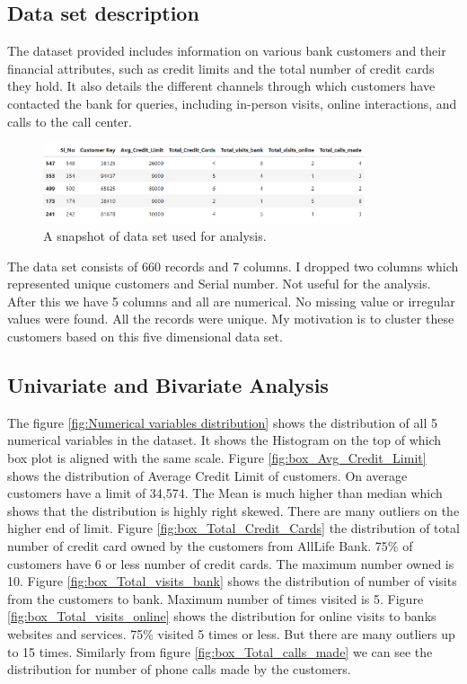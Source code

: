 \documentclass[10pt,a4paper]{style}
\begin{document}
	\subsection{Data set description}
		The dataset provided includes information on various bank customers and their financial attributes, such as credit limits and the total number of credit cards they hold. It also details the different channels through which customers have contacted the bank for queries, including in-person visits, online interactions, and calls to the call center.
		\begin{figure}[h]
			\centering
			\includegraphics[width=0.85\textwidth]{dataset.png}
			\caption{A snapshot of data set used for analysis.}
			\label{fig:dataset}
		\end{figure}
		The data set consists of 660 records and 7 columns. I dropped two columns which represented unique customers and Serial number. Not useful for the analysis. After this we have 5 columns and all are numerical. No missing value or irregular values
		were found. All the records were unique. My motivation is to cluster these customers based on this five dimensional data set. 
	\subsection{Univariate and Bivariate Analysis}
	The figure \ref{fig:Numerical variables distribution} shows the distribution of all 5 numerical variables in the dataset. It shows the Histogram on the top of which box plot is aligned with the same scale. Figure \ref{fig:box_Avg_Credit_Limit} shows the distribution of Average Credit Limit of customers. On average customers have a  limit of 34,574. The Mean is much higher than median which shows that the distribution is highly right skewed. There are many outliers on the higher end of limit.
	Figure \ref{fig:box_Total_Credit_Cards} the distribution of total number of credit card owned by the customers from AllLife Bank. 75\% of customers have 6 or less number of credit cards. The maximum number owned is 10.
	Figure \ref{fig:box_Total_visits_bank} shows the distribution of number of visits from the customers to bank. Maximum number of times visited is 5. Figure \ref{fig:box_Total_visits_online} shows the distribution for online visits to banks websites and services. 75\% visited 5 times or less. But there are many outliers up to 15 times. Similarly from figure \ref{fig:box_Total_calls_made} we can see the distribution for number of phone calls made by the customers. 
	 
\end{document}
